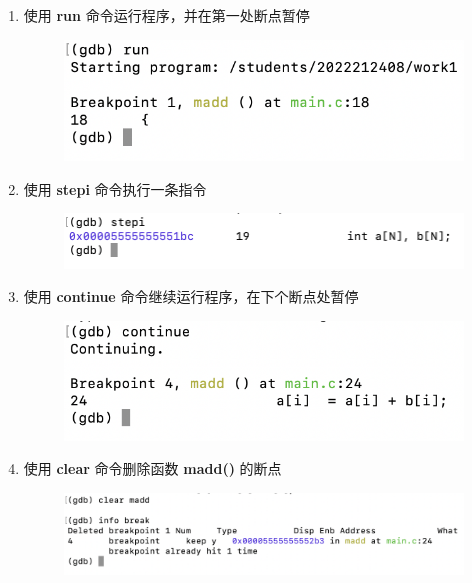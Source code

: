\documentclass[UTF8, 12pt, a4paper, oneside]{ctexart}
\begin{document}
\begin{enumerate}
\begin{figure}[htbp]
                    \end{figure}
                \item 使用 \textbf{run} 命令运行程序，并在第一处断点暂停
                    \begin{figure}[htbp]
                        \includegraphics*[width = 12cm]{2.7.png}                        
                    \end{figure}
                \item 使用 \textbf{stepi} 命令执行一条指令
                    \begin{figure}[htbp]
                        \includegraphics*[width = 14cm]{2.8.png}                        
                    \end{figure}
                \newpage
                \item 使用 \textbf{continue} 命令继续运行程序，在下个断点处暂停
                    \begin{figure}[htbp]
                        \includegraphics*[width = 12cm]{2.9.png}                        
                    \end{figure}
                \item 使用 \textbf{clear} 命令删除函数 \textbf{madd()} 的断点
                    \begin{figure}[htbp]
                        \includegraphics*[width = 14cm]{2.10.png}                        

\end{figure}
\end{enumerate}
\end{document}
